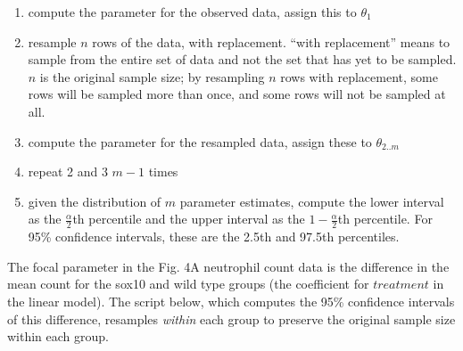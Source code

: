 \documentclass[]{book}
\providecommand{\tightlist}{%
  \setlength{\itemsep}{0pt}\setlength{\parskip}{0pt}}
\begin{document}
\begin{enumerate}
\def\labelenumi{\arabic{enumi}.}
\tightlist
\item
  compute the parameter for the observed data, assign this to
  \(\theta_1\)
\item
  resample \(n\) rows of the data, with replacement. ``with
  replacement'' means to sample from the entire set of data and not the
  set that has yet to be sampled. \(n\) is the original sample size; by
  resampling \(n\) rows with replacement, some rows will be sampled more
  than once, and some rows will not be sampled at all.
\item
  compute the parameter for the resampled data, assign these to
  \(\theta_{2..m}\)
\item
  repeat 2 and 3 \(m-1\) times
\item
  given the distribution of \(m\) parameter estimates, compute the lower
  interval as the \(\frac{\alpha}{2}\)th percentile and the upper
  interval as the \(1 - \frac{\alpha}{2}\)th percentile. For 95\%
  confidence intervals, these are the 2.5th and 97.5th percentiles.
\end{enumerate}

The focal parameter in the Fig. 4A neutrophil count data is the
difference in the mean count for the sox10 and wild type groups (the
coefficient for \(treatment\) in the linear model). The script below,
which computes the 95\% confidence intervals of this difference,
resamples \emph{within} each group to preserve the original sample size
within each group.
\end{document}
